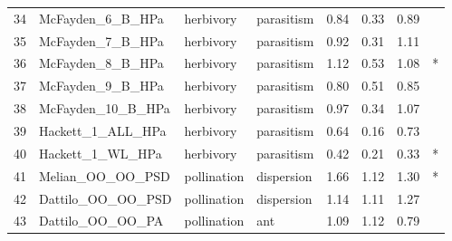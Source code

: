 \begin{tabular}{llllrrrl}
34 &    McFayden\_6\_B\_HPa &    herbivory &   parasitism &   0.84 &    0.33 &    0.89 &                 \\
35 &    McFayden\_7\_B\_HPa &    herbivory &   parasitism &   0.92 &    0.31 &    1.11 &                 \\
36 &    McFayden\_8\_B\_HPa &    herbivory &   parasitism &   1.12 &    0.53 &    1.08 &               * \\
37 &    McFayden\_9\_B\_HPa &    herbivory &   parasitism &   0.80 &    0.51 &    0.85 &                 \\
38 &   McFayden\_10\_B\_HPa &    herbivory &   parasitism &   0.97 &    0.34 &    1.07 &                 \\
39 &   Hackett\_1\_ALL\_HPa &    herbivory &   parasitism &   0.64 &    0.16 &    0.73 &                 \\
40 &    Hackett\_1\_WL\_HPa &    herbivory &   parasitism &   0.42 &    0.21 &    0.33 &               * \\
41 &    Melian\_OO\_OO\_PSD &  pollination &   dispersion &   1.66 &    1.12 &    1.30 &               * \\
42 &   Dattilo\_OO\_OO\_PSD &  pollination &   dispersion &   1.14 &    1.11 &    1.27 &                 \\
43 &    Dattilo\_OO\_OO\_PA &  pollination &          ant &   1.09 &    1.12 &    0.79 &                 \\
\bottomrule
\end{tabular}
